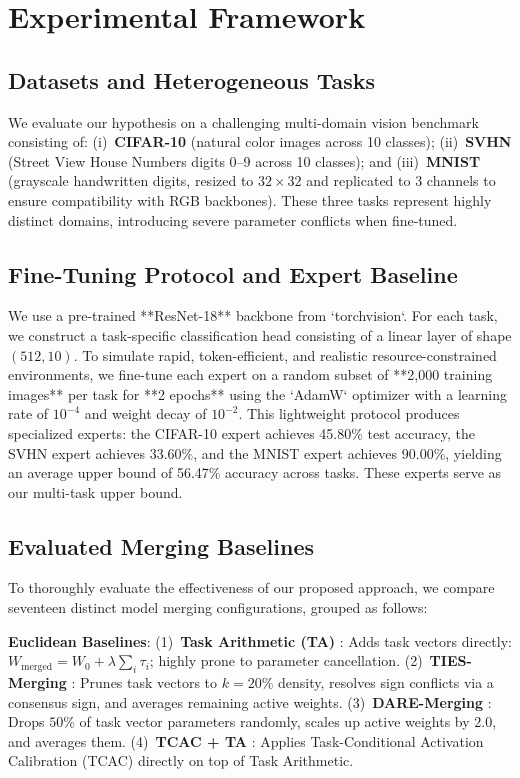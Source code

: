 \documentclass{article}
\begin{document}
\section{Experimental Framework}
\label{sec:experiments}

\subsection{Datasets and Heterogeneous Tasks}
We evaluate our hypothesis on a challenging multi-domain vision benchmark consisting of: (i)~\textbf{CIFAR-10} (natural color images across 10 classes); (ii)~\textbf{SVHN} (Street View House Numbers digits 0--9 across 10 classes); and (iii)~\textbf{MNIST} (grayscale handwritten digits, resized to $32 \times 32$ and replicated to 3 channels to ensure compatibility with RGB backbones). These three tasks represent highly distinct domains, introducing severe parameter conflicts when fine-tuned.

\subsection{Fine-Tuning Protocol and Expert Baseline}
We use a pre-trained **ResNet-18** backbone from `torchvision`. For each task, we construct a task-specific classification head consisting of a linear layer of shape $(512, 10)$. 
To simulate rapid, token-efficient, and realistic resource-constrained environments, we fine-tune each expert on a random subset of **2,000 training images** per task for **2 epochs** using the `AdamW` optimizer \cite{loshchilov2017decoupled} with a learning rate of $10^{-4}$ and weight decay of $10^{-2}$.
This lightweight protocol produces specialized experts: the CIFAR-10 expert achieves 45.80\% test accuracy, the SVHN expert achieves 33.60\%, and the MNIST expert achieves 90.00\%, yielding an average upper bound of 56.47\% accuracy across tasks. These experts serve as our multi-task upper bound.

\subsection{Evaluated Merging Baselines}
To thoroughly evaluate the effectiveness of our proposed approach, we compare seventeen distinct model merging configurations, grouped as follows:

\textbf{Euclidean Baselines}: (1)~\textbf{Task Arithmetic (TA)} \cite{ilharco22_editing}: Adds task vectors directly: $W_{\text{merged}} = W_0 + \lambda \sum_i \tau_i$; highly prone to parameter cancellation. (2)~\textbf{TIES-Merging} \cite{yadav23_ties}: Prunes task vectors to $k=20\%$ density, resolves sign conflicts via a consensus sign, and averages remaining active weights. (3)~\textbf{DARE-Merging} \cite{yu24_dare}: Drops $50\%$ of task vector parameters randomly, scales up active weights by $2.0$, and averages them. (4)~\textbf{TCAC + TA} \cite{jung24_symerge}: Applies Task-Conditional Activation Calibration (TCAC) directly on top of Task Arithmetic.
\end{document}
